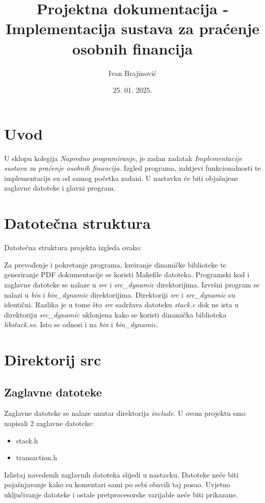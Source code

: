 \documentclass[12pt, letterpaper]{article}
\title{Projektna dokumentacija - Implementacija sustava za praćenje osobnih financija}
\author{Ivan Brajinović}
\date{25. 01. 2025.}
\begin{document}
	\maketitle

	\newpage
  \section{Uvod}
  U sklopu kolegija \textit{Napredno programiranje}, je zadan zadatak \textit{Implementacije sustava za praćenje osobnih financija}. Izgled programa, zahtjevi funkcionalnosti te implementacije su od samog početka zadani. U nastavku će biti objašnjene zaglavne datoteke i glavni program.

	\section{Datotečna struktura}
	Datotečna struktura projekta izgleda ovako:
  

  Za prevođenje i pokretanje programa, kreiranje dinamičke biblioteke te generiranje PDF dokumentacije se koristi Makefile datoteka.
  Programski kod i zaglavne datoteke se nalaze u \textit{src} i \textit{src\_dynamic} direktorijima.
  Izvršni program se nalazi u \textit{bin} i \textit{bin\_dynamic} direktorijima.
  Direktoriji \textit{src} i \textit{src\_dynamic} su identični. Razlika je u tome što \textit{src} sadržava datoteku \textit{stack.c} dok ne ista u direktoriju \textit{src\_dynamic} uklonjena kako se koristi dinamička biblioteka \textit{libstack.so}. Isto se odnosi i na \textit{bin} i \textit{bin\_dynamic}.

\section{Direktorij src}
		
  \subsection{Zaglavne datoteke}
  Zaglavne datoteke se nalaze unutar direktorija \textit{include}. U ovom projektu smo napisali 2 zaglavne datoteke:
  \begin{itemize}
    \item stack.h
    \item transaction.h
  \end{itemize}
  Izlistaj navedenih zaglavnih datoteka slijedi u nastavku. Datoteke neće biti pojašnjavanje kako su komentari sami po sebi obavili taj posao. Uvjetno uključivanje datoteke i ostale pretprocesorske varijable neće biti prikazane.
\end{document}
